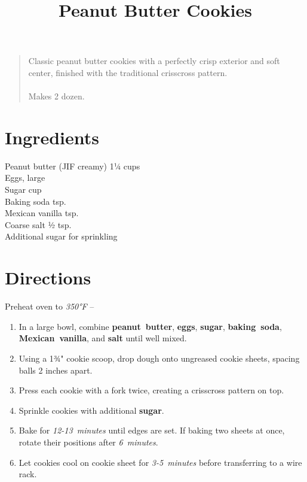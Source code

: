 \documentclass[11pt,letterpaper]{article}
\title{Peanut Butter Cookies}
\author{}
\date{}
\begin{document}
\maketitle
\thispagestyle{empty}

\begin{quote}
\small
\begin{em}
Classic peanut butter cookies with a perfectly crisp exterior and soft center, finished with the traditional crisscross pattern. \\
\\
Makes 2 dozen.
\end{em}
\end{quote}

\section*{Ingredients}
\begin{multicols}{2}
\noindent
    Peanut butter (JIF creamy) \dotfill 1¼ cups \\
    Eggs, large  \\
    Sugar  cup \\
    Baking soda  tsp. \\
    Mexican vanilla  tsp. \\
    Coarse salt \dotfill ½ tsp. \\
    Additional sugar for sprinkling
\end{multicols}

\section*{Directions}

\noindent
Preheat oven to \textit{350°F} -- 

\begin{enumerate}
    \item In a large bowl, combine \textbf{peanut~butter}, \textbf{eggs}, \textbf{sugar}, \textbf{baking~soda}, \\\textbf{Mexican~vanilla}, and \textbf{salt} until well mixed.
    \item Using a 1¾" cookie scoop, drop dough onto ungreased cookie sheets, spacing balls 2 inches apart.
    \item Press each cookie with a fork twice, creating a crisscross pattern on top.
    \item Sprinkle cookies with additional \textbf{sugar}.
    \item Bake for \textit{12-13~minutes} until edges are set. If baking two sheets at once, rotate their positions after \textit{6~minutes}.
    \item Let cookies cool on cookie sheet for \textit{3-5~minutes} before transferring to a wire rack.
\end{enumerate}
\end{document}
